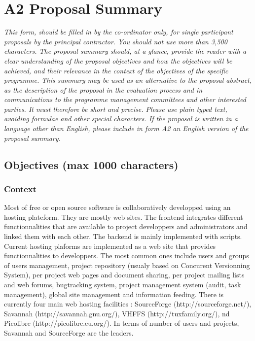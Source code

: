 \documentclass[a4paper,11pt]{report}
\begin{document}
\section*{A2 Proposal Summary}
\textit{This form, should be filled in by the co-ordinator only, for single
participant proposals by the principal contractor. You should not use more than
3,500 characters. The proposal summary should, at a glance, provide the reader
with a clear understanding of the proposal objectives and how the objectives
will be achieved, and their relevance in the context of the objectives of the
specific programme. This summary may be used as an alternative to the proposal
abstract, as the description of the proposal in the evaluation process and in
communications to the programme management committees and other interested
parties. It must therefore be short and precise. Please use plain typed text,
avoiding formulae and other special characters. If the proposal is written in a
language other than English, please include in form A2 an English version of
the proposal summary.} \\
\subsection*{Objectives (max 1000 characters)}
\subsubsection{Context}
Most of free or open source software is collaboratively developped using an
hosting plateform. They are mostly web sites. The frontend integrates different
functionnalities that are available to project developpers and administrators
and linked them with each other. The backend is mainly implemented with
scripts. \\
Current hosting plaforms are implemented as a  web site that provides
functionnalities to developpers. The most common ones include  users and groups
of users management, project repository (usualy based on Concurent Versionning
System), per project web pages and document sharing, per project mailing lists
and web forums, bugtracking system, project management system (audit, task
management), global site management and information feeding. There is currently
four main web hosting facilities : SourceForge (http://sourceforge.net/),
Savannah (http://savannah.gnu.org/), VHFFS (http://tuxfamily.org/), nd
Picolibre (http://picolibre.eu.org/). In terms of number of users and projects,
Savannah and SourceForge are the leaders.
\end{document}
